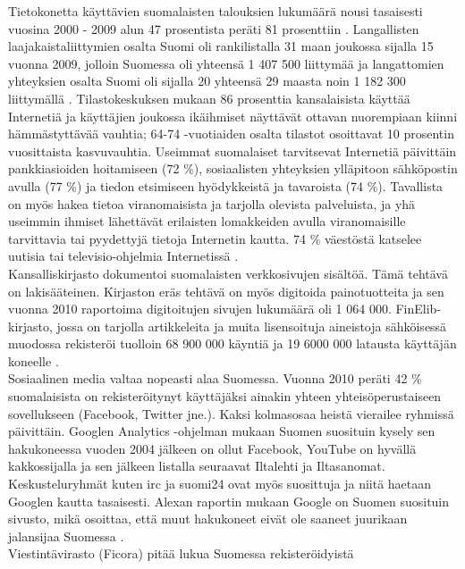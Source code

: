 \begin{multicols}{2}
Tietokonetta käyttävien suomalaisten talouksien lukumäärä nousi
tasaisesti vuosina 2000 - 2009 alun 47 prosentista peräti 81
prosenttiin \cite{OECD-ICT}. Langallisten laajakaistaliittymien osalta
Suomi oli rankilistalla 31 maan joukossa sijalla 15 vuonna 2009,
jolloin Suomessa oli yhteensä 1 407 500 liittymää \cite{OECD-wired} ja
langattomien yhteyksien osalta Suomi oli sijalla 20 yhteensä 29 maasta
noin 1 182 300 liittymällä \cite{OECD-mobile}. 
Tilastokeskuksen mukaan
86 prosenttia kansalaisista käyttää Internetiä ja käyttäjien joukossa
ikäihmiset näyttävät ottavan nuorempiaan kiinni hämmästyttävää
vauhtia; 64-74 -vuotiaiden osalta tilastot osoittavat 10 prosentin
vuosittaista kasvuvauhtia. Useimmat suomalaiset tarvitsevat Internetiä
päivittäin pankkiasioiden hoitamiseen (72 \%), sosiaalisten
yhteyksien ylläpitoon sähköpostin avulla (77 \%) ja tiedon
etsimiseen hyödykkeistä ja tavaroista (74 \%). Tavallista on
myös hakea tietoa viranomaisista ja tarjolla olevista palveluista, ja
yhä useimmin ihmiset lähettävät erilaisten lomakkeiden avulla
viranomaisille tarvittavia tai pyydettyjä tietoja Internetin
kautta. 74 \% väestöstä katselee uutisia tai televisio-ohjelmia Internetissä \cite{SVT}.\\
Kansalliskirjasto dokumentoi suomalaisten verkkosivujen sisältöä. Tämä
tehtävä on lakisääteinen. Kirjaston eräs tehtävä on myös digitoida
painotuotteita ja sen vuonna 2010 raportoima digitoitujen sivujen
lukumäärä oli 1 064 000.  FinElib-kirjasto, jossa on tarjolla
artikkeleita ja muita lisensoituja aineistoja sähköisessä muodossa
rekisteröi tuolloin 68 900 000 käyntiä ja 19 6000 000 latausta
käyttäjän koneelle \cite{natlibstat}.\\
Sosiaalinen media valtaa nopeasti alaa Suomessa. Vuonna 2010 peräti 42
\% suomalaisista on rekisteröitynyt käyttäjäksi ainakin yhteen
yhteisöperustaiseen sovellukseen (Facebook, Twitter jne.). Kaksi
kolmasosaa heistä vierailee ryhmissä päivittäin. Googlen Analytics
-ohjelman mukaan Suomen suosituin kysely sen hakukoneessa vuoden 2004
jälkeen on ollut Facebook, YouTube on hyvällä kakkossijalla ja sen
jälkeen listalla seuraavat Iltalehti ja Iltasanomat. Keskusteluryhmät
kuten irc ja suomi24 ovat myös suosittuja ja niitä haetaan Googlen
kautta tasaisesti. Alexan raportin mukaan Google on Suomen suosituin
sivusto, mikä osoittaa, että muut hakukoneet eivät ole saaneet
juurikaan jalansijaa Suomessa \cite{topsites}.\\
Viestintävirasto (Ficora) pitää lukua Suomessa rekisteröidyistä

\end{multicols}

